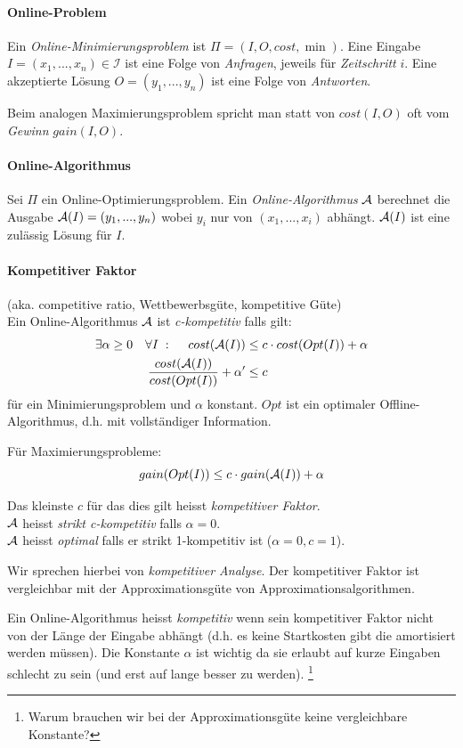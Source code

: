 \paragraph{Online-Problem}
Ein \emph{Online-Minimierungsproblem} ist $\Pi = (I, O, cost, \min)$.
Eine Eingabe $I = (x_1, ..., x_n) \in \mathcal{I}$ ist eine Folge von \emph{Anfragen},
jeweils für \emph{Zeitschritt} $i$.
Eine akzeptierte Lösung $O = (y_1, ..., y_n)$ ist eine Folge von \emph{Antworten}.

Beim analogen Maximierungsproblem spricht man statt von $cost(I, O)$ oft vom \emph{Gewinn} $gain(I,O)$.

\paragraph{Online-Algorithmus}
Sei $\Pi$ ein Online-Optimierungsproblem.
Ein \emph{Online-Algorithmus} $\mathcal{A}$ berechnet die Ausgabe $\mathcal{A}(I) = (y_1, ..., y_n) $
wobei $y_i$ nur von $(x_1, ..., x_i)$ abhängt.
$\mathcal{A}(I)$ ist eine zulässig Lösung für $I$.

\paragraph{Kompetitiver Faktor}
(aka. competitive ratio, Wettbewerbsgüte, kompetitive Güte) \\
Ein Online-Algorithmus $\mathcal{A}$ ist \emph{c-kompetitiv} falls gilt:
\begin{align*}
\exists \alpha \geq 0 \quad \forall I \; : \; \quad cost(\mathcal{A}(I)) & \leq c \cdot cost(Opt(I)) + \alpha \\
\dfrac{cost(\mathcal{A}(I))}{cost(Opt(I))} + \alpha' & \leq c
\end{align*}
für ein Minimierungsproblem und $\alpha$ konstant.
$Opt$ ist ein optimaler Offline-Algorithmus, d.h. mit vollständiger Information.

Für Maximierungsprobleme:
$$ gain(Opt(I)) \leq c \cdot gain(\mathcal{A}(I)) + \alpha $$

Das kleinste $c$ für das dies gilt heisst \emph{kompetitiver Faktor}. \\
$\mathcal{A}$ heisst \emph{strikt c-kompetitiv} falls $\alpha = 0$. \\
$\mathcal{A}$ heisst \emph{optimal} falls er strikt 1-kompetitiv ist ($\alpha = 0, c = 1$).

Wir sprechen hierbei von \emph{kompetitiver Analyse}.
Der kompetitiver Faktor ist vergleichbar mit der Approximationsgüte von Approximationsalgorithmen.

Ein Online-Algorithmus heisst \emph{kompetitiv} wenn sein kompetitiver Faktor nicht von der
Länge der Eingabe abhängt (d.h. es keine Startkosten gibt die amortisiert werden müssen).
Die Konstante $\alpha$ ist wichtig da sie erlaubt auf kurze Eingaben schlecht zu sein
(und erst auf lange besser zu werden).
\footnote{Warum brauchen wir bei der Approximationsgüte keine vergleichbare Konstante?}

